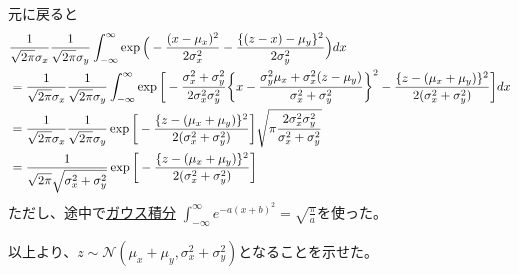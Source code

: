 \documentclass[aspectratio=169,unicode,dvipdfmx,14pt]{beamer}
\begin{document}
\begin{frame}
\FontMath
元に戻ると
\begin{align}
& \frac{1}{\sqrt{2\pi}\sigma_x}
\frac{1}{\sqrt{2\pi}\sigma_y}
\int_{-\infty}^{\infty}
\exp\Big(-\frac{(x-\mu_x)^2}{2\sigma_x^2}
-\frac{\{(z-x)-\mu_y\}^2}{2\sigma_y^2}\Big)dx
\notag \\ & =
\frac{1}{\sqrt{2\pi}\sigma_x}
\frac{1}{\sqrt{2\pi}\sigma_y}
\int_{-\infty}^{\infty}
\exp\bigg[
-\frac{\sigma_x^2+\sigma_y^2}{2\sigma_x^2\sigma_y^2}\bigg\{
x - \frac{\sigma_y^2\mu_x+\sigma_x^2(z-\mu_y)}{\sigma_x^2+\sigma_y^2}\bigg\}^2
-\frac{\{ z - (\mu_x + \mu_y) \}^2}{2(\sigma_x^2+\sigma_y^2)}
\bigg]dx
\notag \\ & =
\frac{1}{\sqrt{2\pi}\sigma_x}
\frac{1}{\sqrt{2\pi}\sigma_y}
\exp\bigg[
-\frac{\{ z - (\mu_x + \mu_y) \}^2}{2(\sigma_x^2+\sigma_y^2)}
\bigg]
\sqrt{ \pi \frac{2\sigma_x^2\sigma_y^2}{\sigma_x^2+\sigma_y^2} }
\notag \\ & =
\frac{1}{\sqrt{2\pi} \sqrt{\sigma_x^2+\sigma_y^2} }
\exp\bigg[
-\frac{\{ z - (\mu_x + \mu_y) \}^2}{2(\sigma_x^2+\sigma_y^2)}
\bigg]
\end{align}
ただし、途中で\href{https://en.wikipedia.org/wiki/Gaussian_integral}{ガウス積分}
$\int_{-\infty}^\infty e^{-a(x+b)^2} = \sqrt{\frac{\pi}{a}}$を使った。

以上より、$z\sim\mathcal{N}(\mu_x + \mu_y, \sigma_x^2+\sigma_y^2)$となることを示せた。
\end{frame}
\end{document}
